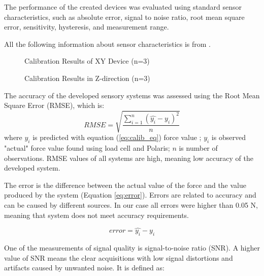 The performance of the created devices was evaluated using standard sensor characteristics, such as absolute error, signal to noise ratio, root mean square error, sensitivity, hysteresis, and measurement range.

All the following information about sensor characteristics is from \cite{kalantar-zadeh_sensors_2013}.

\begin{figure}[h]%
\centering
{}%
\qquad
{}%
\caption{Calibration Results of XY Device (n=3)}
\label{fig:XY_calib_res}%
\end{figure}

\begin{figure}[h]%
\centering
{}%
\qquad
{}%
\caption{Calibration Results in Z-direction (n=3)}
\label{fig:Z_calib_res}%
\end{figure}

The accuracy of the developed sensory systems was assessed using the Root Mean Square Error (RMSE), which is:
\begin{equation}
RMSE = \sqrt{\frac{\sum_{i=1}^{n}{{(\hat{y_i} - y_i)}^2}}{n}}
\end{equation}
where $\hat{y_i}$ is predicted with equation (\ref{eq:calib_eq}) force value ; $y_i$ is observed "actual" force value found using load cell and Polaris; $n$ is number of observations.
RMSE values of all systems are high, meaning low accuracy of the developed system.

The error is the difference between the actual value of the force and the value produced by the system (Equation \ref{eq:error}). Errors are related to accuracy and can be caused by different sources. In our case all errors were higher than 0.05 N, meaning that system does not meet accuracy requirements.

\begin{equation}\label{eq:error}
error = \hat{y_i} - y_i
\end{equation}

One of the measurements of signal quality is signal-to-noise ratio (SNR). A higher value of SNR means the clear acquisitions with low signal distortions and artifacts caused by unwanted noise. It is defined as:

